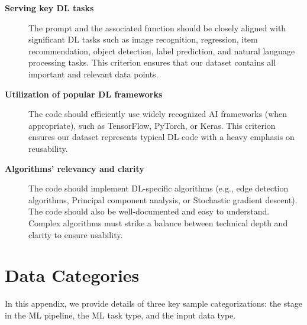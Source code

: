 \begin{description}
\item[\textbf{Serving key DL tasks}] The prompt and the associated function should be closely aligned with significant DL tasks such as image recognition, regression, item recommendation, object detection, label prediction, and natural language processing tasks. This criterion ensures that our dataset contains all important and relevant data points\cite{xie2024frontiers}.

\item[\textbf{Utilization of popular DL frameworks}] The code should efficiently use widely recognized AI frameworks (when appropriate), such as TensorFlow, PyTorch, or Keras. This criterion ensures our dataset represents typical DL code with a heavy emphasis on reusability\cite{assi2024unraveling}.

\item[\textbf{Algorithms' relevancy and clarity}] The code should implement DL-specific algorithms (e.g., edge detection algorithms, Principal component analysis, or Stochastic gradient descent). The code should also be well-documented and easy to understand. Complex algorithms must strike a balance between technical depth and clarity to ensure usability.
\end{description}

\section{Data Categories}
In this appendix, we provide details of three key sample categorizations: the stage in the ML pipeline, the ML task type, and the input data type. 


